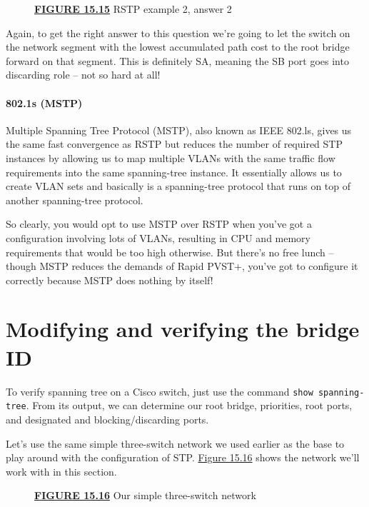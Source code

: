 \documentclass[b5paper,11pt]{memoir}
\begin{document}
\begin{figure}
\centering
\caption{{\protect\hyperlink{c15.xhtmlux5cux23figureanchor15-15}{\textbf{FIGURE
15.15}} RSTP example 2, answer 2}}
\end{figure}

Again, to get the right answer to this question we're going to let the
switch on the network segment with the lowest accumulated path cost to
the root bridge forward on that segment. This is definitely SA, meaning
the SB port goes into discarding role -- not so hard at all!

\paragraph[802.1s
(MSTP)]{\texorpdfstring{802.1s
(MSTP)}{802.1s (MSTP)}}

Multiple Spanning Tree Protocol (MSTP), also known as IEEE 802.ls, gives
us the same fast convergence as RSTP but reduces the number of required
STP instances by allowing us to map multiple VLANs with the same traffic
flow requirements into the same spanning-tree instance. It essentially
allows us to create VLAN sets and basically is a spanning-tree protocol
that runs on top of another spanning-tree protocol.

So clearly, you would opt to use MSTP over RSTP when you've got a
configuration involving lots of VLANs, resulting in CPU and memory
requirements that would be too high otherwise. But there's no free
lunch -- though MSTP reduces the demands of Rapid PVST+, you've got to
configure it correctly because MSTP does nothing by itself!

\section{Modifying and verifying the bridge ID}

To verify spanning tree on a Cisco switch, just use the command
\texttt{show\ spanning-tree}. From its output, we can determine our root
bridge, priorities, root ports, and designated and blocking/discarding
ports.

Let's use the same simple three-switch network we used earlier as the
base to play around with the configuration of STP.
\protect\hyperlink{c15.xhtmlux5cux23figure15-16}{Figure 15.16} shows the
network we'll work with in this section.

\begin{figure}
\centering
\caption{{\protect\hyperlink{c15.xhtmlux5cux23figureanchor15-16}{\textbf{FIGURE
15.16}} Our simple three-switch network}}
\end{figure}
\end{document}
